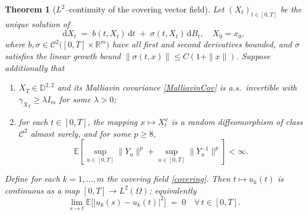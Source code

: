 \documentclass[]{interact}
\newcommand{\1}{\mathbf{1}}
\theoremstyle{plain}%
\newtheorem{theorem}{Theorem}[section]
\theoremstyle{definition}
\theoremstyle{remark}
\numberwithin{equation}{section}
\begin{document}
\begin{theorem}[{$L^2$}–continuity of the covering vector field]
Let $(X_t)_{t\in[0,T]}$ be the unique solution of
\[
  \mathrm dX_t \;=\; b(t,X_t)\,\mathrm dt \;+\;\sigma(t,X_t)\,\mathrm dB_t,
  \quad X_0=x_0,
\]
where $b,\sigma\in \mathcal{C}^2\bigl([0,T]\times\mathbb{R}^m\bigr)$ have all first and second derivatives bounded, and
$\sigma$ satisfies the linear growth bound $\|\sigma(t,x)\|\le C(1+\|x\|)$.  
Suppose additionally that
\begin{enumerate}[label=(\roman*)]
  \item $X_T\in\mathbb{D}^{2,2}$ and its Malliavin covariance \eqref{MalliavinCov}
    is a.s.\ invertible with
    $\gamma_{X_T}\ge\lambda I_m$ for some $\lambda>0$;
  \item for each $t \in [0,T]$, the mapping $x \mapsto X_t^x$ is a random diffeomorphism of class $\mathcal{C}^2$ almost surely, and for some $p \geq 8$,
    \[
    \mathbb{E}\left[\sup_{u\in[0,T]} \|Y_u\|^p + \sup_{u\in[0,T]} \|Y_u^{-1}\|^p\right] < \infty.
    \]
\end{enumerate}
Define for each $k=1,\dots,m$ the covering field \eqref{covering}.
Then $t\mapsto u_k(t)$ is continuous as a map
$[0,T]\to L^2(\Omega)$; equivalently
\[
  \lim_{s\to t}\mathbb{E}\bigl[|u_k(s)-u_k(t)|^2\bigr]\;=\;0
  \quad\forall\,t\in[0,T].
\]
\end{theorem}
\end{document}
